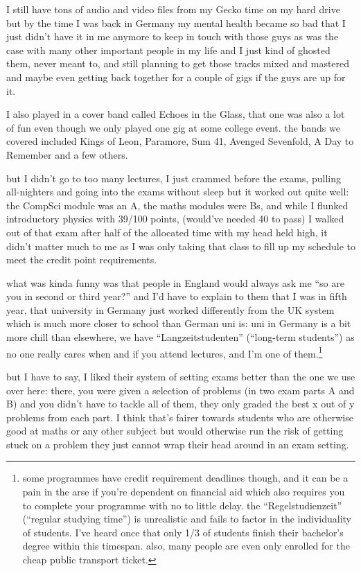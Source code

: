 \documentclass[12pt]{report}
\theoremstyle{definition}
\theoremstyle{remark}
\begin{document}
I still have tons of audio and video files from my Gecko time on my hard drive but by the time I was back in Germany my mental health became so bad that I just didn't have it in me anymore to keep in touch with those guys as was the case with many other important people in my life and I just kind of ghosted them, never meant to, and still planning to get those tracks mixed and mastered and maybe even getting back together for a couple of gigs if the guys are up for it.

I also played in a cover band called Echoes in the Glass, that one was also a lot of fun even though we only played one gig at some college event. the bands we covered included Kings of Leon, Paramore, Sum 41, Avenged Sevenfold, A Day to Remember and a few others.

but I didn't go to too many lectures, I just crammed before the exams, pulling all-nighters and going into the exams without sleep but it worked out quite well:
the CompSci module was an A, the maths modules were Bs, and while I flunked introductory physics with 39/100 points, (would've needed 40 to pass) I walked out of that exam after half of the allocated time with my head held high, it didn't matter much to me as I was only taking that class to fill up my schedule to meet the credit point requirements.

what was kinda funny was that people in England would always ask me ``so are you in second or third year?'' and I'd have to explain to them that I was in fifth year, that university in Germany just worked differently from the UK system which is much more closer to school than German uni is: uni in Germany is a bit more chill than elsewhere, we have ``Langzeitstudenten'' (``long-term students'') as no one really cares when and if you attend lectures, and I'm one of them.\footnote{some programmes have credit requirement deadlines though, and it can be a pain in the arse if you're dependent on financial aid which also requires you to complete your programme with no to little delay. the ``Regelstudienzeit'' (``regular studying time'') is unrealistic and fails to factor in the individuality of students. I've heard once that only 1/3 of students finish their bachelor's degree within this timespan. also, many people are even only enrolled for the cheap public transport ticket.}

but I have to say, I liked their system of setting exams better than the one we use over here: there, you were given a selection of problems (in two exam parts A and B) and you didn't have to tackle all of them, they only graded the best x out of y problems from each part. I think that's fairer towards students who are otherwise good at maths or any other subject but would otherwise run the risk of getting stuck on a problem they just cannot wrap their head around in an exam setting.
\end{document}
